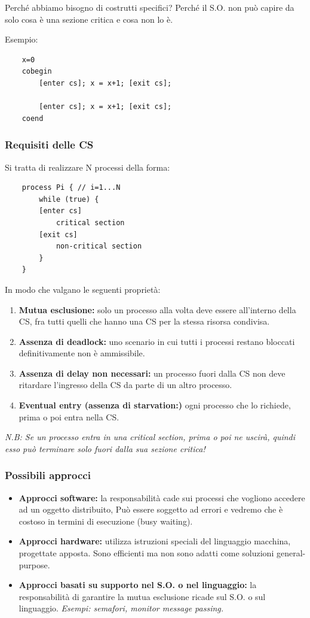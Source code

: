 Perché abbiamo bisogno di costrutti specifici? Perché il S.O. non può capire da solo cosa è una sezione critica e cosa non lo è.

Esempio:
\begin{lstlisting}
    x=0
    cobegin
        [enter cs]; x = x+1; [exit cs];

        [enter cs]; x = x+1; [exit cs];
    coend
\end{lstlisting}

\subsubsection{Requisiti delle CS}
Si tratta di realizzare N processi della forma:
\begin{lstlisting}
    process Pi { // i=1...N 
        while (true) {
        [enter cs]
            critical section
        [exit cs]
            non-critical section
        }
    }       
\end{lstlisting}
  
In modo che valgano le seguenti proprietà:
\begin{enumerate}
    \item \textbf{Mutua esclusione:} solo un processo alla volta deve essere all'interno della CS, fra tutti quelli che hanno una CS per la stessa risorsa condivisa.
    \item \textbf{Assenza di deadlock:} uno scenario in cui tutti i processi restano bloccati definitivamente non è ammissibile.
    \item \textbf{Assenza di delay non necessari:} un processo fuori dalla CS non deve ritardare l'ingresso della CS da parte di un altro processo.
    \item \textbf{Eventual entry (assenza di starvation:)} ogni processo che lo richiede, prima o poi entra nella CS.
\end{enumerate}
 \textit{N.B: Se un processo entra in una critical section, prima o poi ne uscirà, quindi esso può terminare solo fuori dalla sua sezione critica!}

 \subsubsection{Possibili approcci}
 \begin{itemize}
    \item \textbf{Approcci software:} la responsabilità cade sui processi che vogliono accedere ad un oggetto distribuito, Può essere soggetto ad errori e vedremo che è costoso in termini di esecuzione (busy waiting).
    \item \textbf{Approcci hardware:} utilizza istruzioni speciali del linguaggio macchina, progettate apposta. Sono efficienti ma non sono adatti come soluzioni general-purpose.
    \item \textbf{Approcci basati su supporto nel S.O. o nel linguaggio:} la responsabilità di garantire la mutua esclusione ricade sul S.O. o sul linguaggio.
    \textit{Esempi: semafori, monitor message passing.}
 \end{itemize}
\newpage

